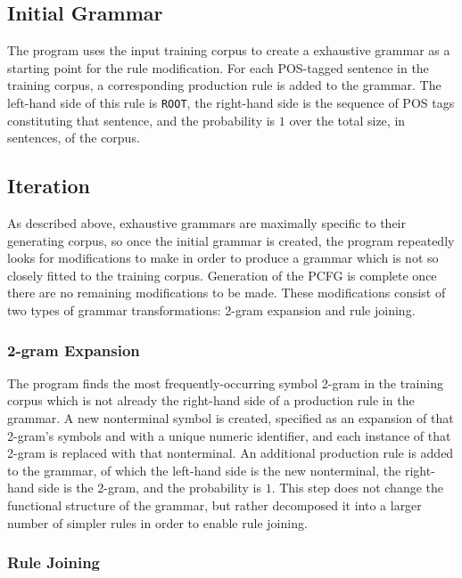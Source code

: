 \documentclass[paper=a4, fontsize=11pt]{scrartcl} %
\numberwithin{equation}{section} %
\numberwithin{figure}{section} %
\numberwithin{table}{section} %
\begin{document}
\subsection{Initial Grammar}

The program uses the input training corpus to create a exhaustive grammar as a starting point for the rule modification. For each POS-tagged sentence in the training corpus, a corresponding production rule is added to the grammar. The left-hand side of this rule is \texttt{ROOT}, the right-hand side is the sequence of POS tags constituting that sentence, and the probability is $1$ over the total size, in sentences, of the corpus.
\subsection{Iteration}

As described above, exhaustive grammars are maximally specific to their generating corpus, so once the initial grammar is created, the program repeatedly looks for modifications to make in order to produce a grammar which is not so closely fitted to the training corpus. Generation of the PCFG is complete once there are no remaining modifications to be made. These modifications consist of two types of grammar transformations: 2-gram expansion and rule joining.

\subsubsection{2-gram Expansion}

The program finds the most frequently-occurring symbol 2-gram in the training corpus which is not already the right-hand side of a production rule in the grammar. A new nonterminal symbol is created, specified as an expansion of that 2-gram's symbols and with a unique numeric identifier, and each instance of that 2-gram is replaced with that nonterminal. An additional production rule is added to the grammar, of which the left-hand side is the new nonterminal, the right-hand side is the 2-gram, and the probability is $1$. This step does not change the functional structure of the grammar, but rather decomposed it into a larger number of simpler rules in order to enable rule joining.

\subsubsection{Rule Joining}
\end{document}
